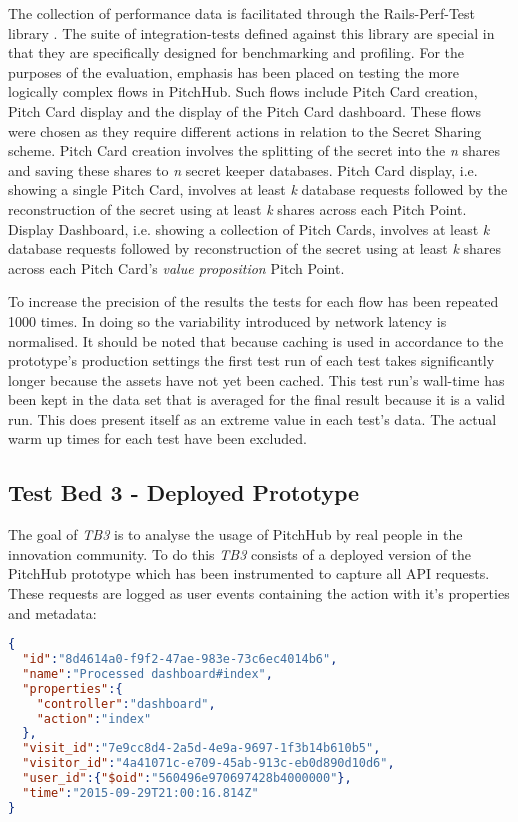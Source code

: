 The collection of performance data is facilitated through the Rails-Perf-Test library \cite{railsperftest:online}. The suite of integration-tests defined against this library are special in that they are specifically designed for benchmarking and profiling. For the purposes of the evaluation, emphasis has been placed on testing the more logically complex flows in PitchHub. Such flows include Pitch Card creation, Pitch Card display and the display of the Pitch Card dashboard. These flows were chosen as they require different actions in relation to the Secret Sharing scheme. Pitch Card creation involves the splitting of the secret into the \textit{n} shares and saving these shares to \textit{n} secret keeper databases. Pitch Card display, i.e. showing a single Pitch Card, involves at least \textit{k} database requests followed by the reconstruction of the secret using at least \textit{k} shares across each Pitch Point. Display Dashboard, i.e. showing a collection of Pitch Cards, involves at least \textit{k} database requests followed by reconstruction of the secret using at least \textit{k} shares across each Pitch Card's \textit{value proposition} Pitch Point.

To increase the precision of the results the tests for each flow has been repeated 1000 times. In doing so the variability introduced by network latency is normalised. It should be noted that because caching is used in accordance to the prototype's production settings the first test run of each test takes significantly longer because the assets have not yet been cached. This test run's wall-time has been kept in the data set that is averaged for the final result because it is a valid run. This does present itself as an extreme value in each test's data. The actual warm up times for each test have been excluded.

\subsection{Test Bed 3 - Deployed Prototype}\label{SS:deployedPrototype}
The goal of \textit{TB3} is to analyse the usage of PitchHub by real people in the innovation community. To do this \textit{TB3} consists of a deployed version of the PitchHub prototype which has been instrumented to capture all API requests. These requests are logged as user events containing the action with it's properties and metadata: 

\begin{lstlisting}[language=json,firstnumber=1]
{
  "id":"8d4614a0-f9f2-47ae-983e-73c6ec4014b6",
  "name":"Processed dashboard#index",
  "properties":{
    "controller":"dashboard",
    "action":"index"
  },
  "visit_id":"7e9cc8d4-2a5d-4e9a-9697-1f3b14b610b5",
  "visitor_id":"4a41071c-e709-45ab-913c-eb0d890d10d6",
  "user_id":{"$oid":"560496e970697428b4000000"},
  "time":"2015-09-29T21:00:16.814Z"
}
\end{lstlisting}

